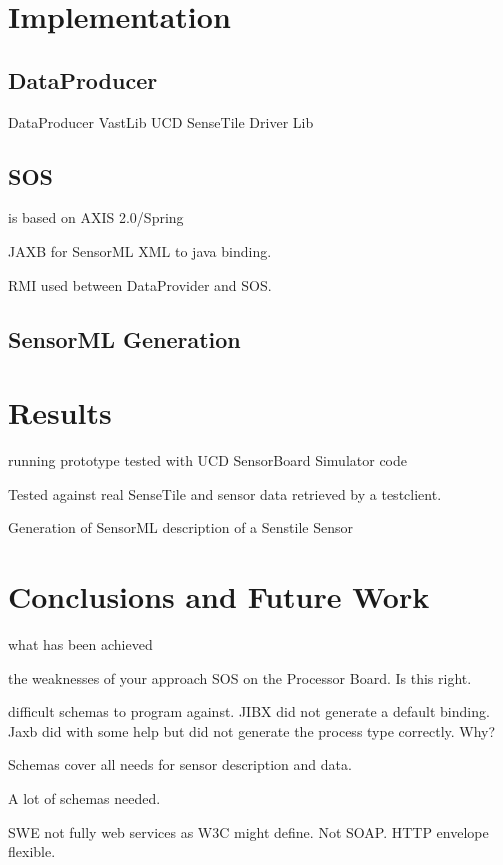 \documentclass[]{final_report}
\begin{document}
\chapter{Implementation}

\section{DataProducer}

DataProducer VastLib UCD SenseTile Driver Lib

\section{SOS}
 is based on AXIS 2.0/Spring

JAXB for SensorML XML to java binding.

RMI used between DataProvider and SOS.

\section{SensorML Generation}

\chapter{Results}

running prototype tested with UCD SensorBoard Simulator code

Tested against real SenseTile and sensor data retrieved by a testclient.

Generation of SensorML description of a Senstile Sensor

\chapter{ Conclusions and Future Work}

what has been achieved

the weaknesses of your approach
SOS on the Processor Board. Is this right.

difficult schemas to program against.
JIBX did not generate a default binding.
Jaxb did with some help but did not generate the process type correctly.
Why?

Schemas cover all needs for sensor description and data.

A lot of schemas needed.

SWE not fully web services as W3C might define. Not SOAP. HTTP envelope
flexible.
\end{document}
